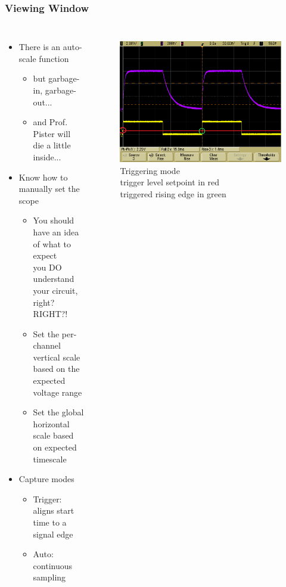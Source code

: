 \documentclass{beamer}
\begin{document}
\begin{frame}
\frametitle{Viewing Window}
\begin{columns}[t]
\begin{itemize}
  \item There is an auto-scale function
  \begin{itemize}
    \item but garbage-in, garbage-out...
    \item and Prof. Pister will die a little inside...
  \end{itemize}
  \item Know how to manually set the scope
  \begin{itemize}
    \item You should have an idea of what to expect \\
    {\scriptsize you DO understand your circuit, right? RIGHT?!}
    \item Set the per-channel vertical scale based on the expected voltage range
    \item Set the global horizontal scale based on expected timescale
  \end{itemize}
  \item Capture modes
  \begin{itemize}
    \item Trigger: aligns start time to a signal edge
    \item Auto: continuous sampling
  \end{itemize}
\end{itemize}

\begin{figure}
  \centering
  \includegraphics[width=1.0\columnwidth]{images-dis2/scope-trigger} \newline
  Triggering mode \\
  {\tiny trigger level setpoint in red} \\
  {\tiny triggered rising edge in green}
\end{figure}
\end{columns}
\end{frame}
\end{document}
